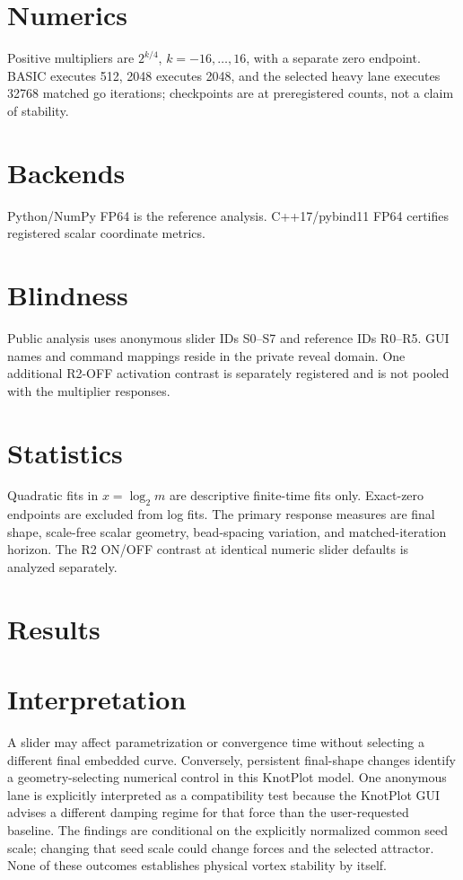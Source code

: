 \documentclass[11pt,a4paper]{article}
\begin{document}
\section{Numerics}
Positive multipliers are $2^{k/4}$, $k=-16,\ldots,16$, with a separate zero endpoint. BASIC executes 512, 2048 executes 2048, and the selected heavy lane executes 32768 matched go iterations; checkpoints are at preregistered counts, not a claim of stability.
\section{Backends}
Python/NumPy FP64 is the reference analysis. C++17/pybind11 FP64 certifies registered scalar coordinate metrics.
\section{Blindness}
Public analysis uses anonymous slider IDs S0--S7 and reference IDs R0--R5. GUI names and command mappings reside in the private reveal domain. One additional R2-OFF activation contrast is separately registered and is not pooled with the multiplier responses.
\section{Statistics}
Quadratic fits in $x=\log_2m$ are descriptive finite-time fits only. Exact-zero endpoints are excluded from log fits. The primary response measures are final shape, scale-free scalar geometry, bead-spacing variation, and matched-iteration horizon. The R2 ON/OFF contrast at identical numeric slider defaults is analyzed separately.
\section{Results}
\section{Interpretation}
A slider may affect parametrization or convergence time without selecting a different final embedded curve. Conversely, persistent final-shape changes identify a geometry-selecting numerical control in this KnotPlot model. One anonymous lane is explicitly interpreted as a compatibility test because the KnotPlot GUI advises a different damping regime for that force than the user-requested baseline. The findings are conditional on the explicitly normalized common seed scale; changing that seed scale could change forces and the selected attractor. None of these outcomes establishes physical vortex stability by itself.
\end{document}
